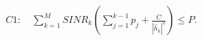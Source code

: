 \documentclass[preview]{standalone}
\begin{document}
\begin{align*}
C1:\quad \sum_{k=1}^{M} SINR_k \left( \sum_{j=1}^{k-1} p_j + \frac{C}{\left|{\hat{h}_k}\right|^2} \right) \leq P.
\end{align*}
\end{document}

